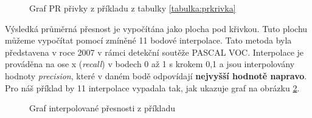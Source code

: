 \begin{figure}[H] 
  \begin{center}
  \label{obrazek:prkrivka}
  \caption{Graf PR přivky z příkladu z tabulky \ref{tabulka:prkrivka}}
  \end{center}
\end{figure}

Výsledká průměrná přesnost je vypočítána jako plocha pod křivkou. Tuto plochu můžeme vypočítat pomocí zmíněné 11 bodové interpolace. Tato metoda byla představena v roce 2007 v rámci detekční soutěže PASCAL VOC. Interpolace je prováděna na ose x (\emph{recall}) v bodech 0 až 1 s krokem 0,1 a jsou interpolovány hodnoty \emph{precision}, které v daném bodě odpovídají \textbf{nejvyšší hodnotě napravo}. Pro náš příklad by 11 interpolace vypadala tak, jak ukazuje graf na obrázku \ref{obrazek:interpolace}.

\begin{figure}[H] 
  \begin{center}
  \label{obrazek:interpolace}
  \caption{Graf interpolované přesnosti z příkladu}
  \end{center}
\end{figure}

